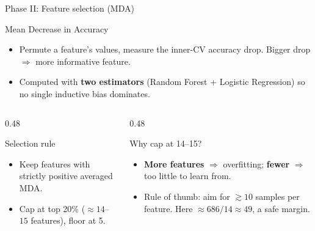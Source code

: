 \documentclass[aspectratio=169, t]{beamer}
\begin{document}
\begin{frame}{Phase II: Feature selection (MDA)}
\vspace{-0.4em}

{
\begin{block}{Mean Decrease in Accuracy}
\footnotesize
\begin{itemize}\setlength{\itemsep}{3pt}
  \item Permute a feature's values, measure the inner-CV accuracy drop. Bigger drop $\Rightarrow$ more informative feature.
  \item Computed with \textbf{two estimators} (Random Forest + Logistic Regression) so no single inductive bias dominates.
\end{itemize}
\end{block}
}

\vspace{0.4em}

\begin{columns}[T]
\begin{column}{0.48\textwidth}
{
\begin{block}{Selection rule}
\footnotesize
\begin{itemize}\setlength{\itemsep}{3pt}
  \item Keep features with strictly positive averaged MDA.
  \item Cap at top 20\% ($\approx 14$--$15$ features), floor at 5.
\end{itemize}
\end{block}
}
\end{column}

\begin{column}{0.48\textwidth}
{
\begin{block}{Why cap at 14--15?}
\footnotesize
\begin{itemize}\setlength{\itemsep}{3pt}
  \item \textbf{More features} $\Rightarrow$ overfitting; \textbf{fewer} $\Rightarrow$ too little to learn from.
  \item Rule of thumb: aim for $\gtrsim 10$ samples per feature. Here $\approx 686 / 14 \approx 49$, a safe margin.
\end{itemize}
\end{block}
}
\end{column}
\end{columns}


\end{frame}
\end{document}
